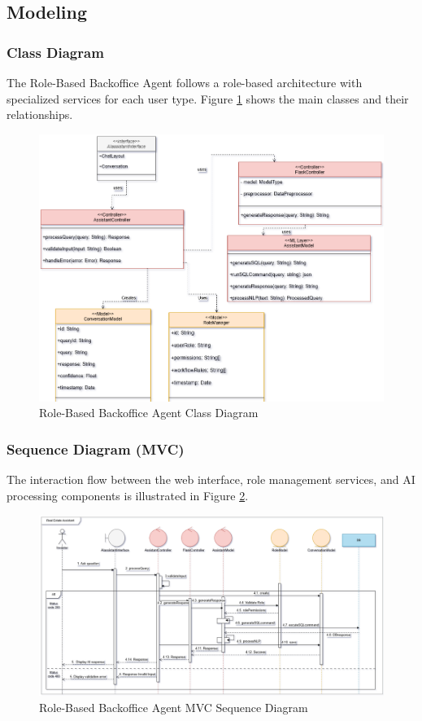 \subsection{Modeling}
\subsubsection{Class Diagram}
The Role-Based Backoffice Agent follows a role-based architecture with specialized services for each user type. Figure \ref{fig:backoffice-class-diagram} shows the main classes and their relationships.
\newpage
\begin{figure}[htbp]
    \centering
    \includegraphics[width=1\textwidth]{images/backoffice_class_diagram.png}
    \caption{Role-Based Backoffice Agent Class Diagram}
    \label{fig:backoffice-class-diagram}
\end{figure}

\subsubsection{Sequence Diagram (MVC)}
The interaction flow between the web interface, role management services, and AI processing components is illustrated in Figure \ref{fig:backoffice-sequence-mvc}.
\newpage
\begin{figure}[htbp]
    \centering
    \includegraphics[width=1.1\textwidth]{images/backoffice_sequence_mvc.png}
    \caption{Role-Based Backoffice Agent MVC Sequence Diagram}
    \label{fig:backoffice-sequence-mvc}
\end{figure}

